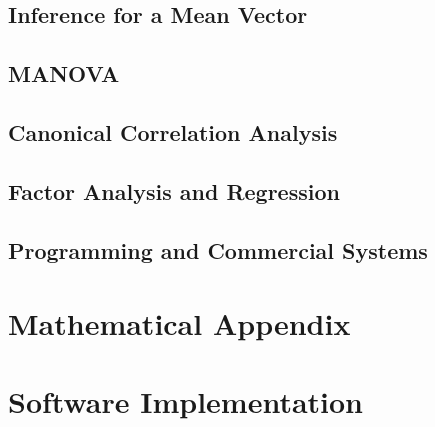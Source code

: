 \documentclass[12pt]{book}
\theoremstyle{definition}
\theoremstyle{remark}
\begin{document}
\section{Inference for a Mean Vector}

\section{MANOVA}

\section{Canonical Correlation Analysis}

\section{Factor Analysis and Regression}

\section{Programming and Commercial Systems}

\backmatter

\appendix

\chapter{Mathematical Appendix}

\chapter{Software Implementation}
\end{document}
